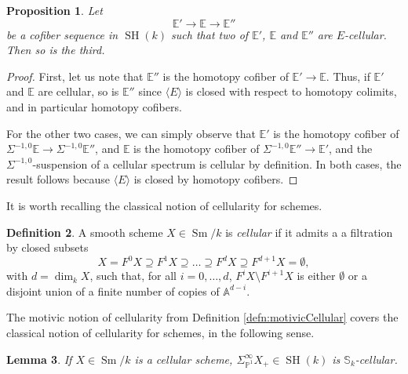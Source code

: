 \documentclass[10pt]{amsart}
\theoremstyle{definition}
\newtheorem{defn}{Definition}[section]
\theoremstyle{plain}
\newtheorem{prop}[defn]{Proposition}
\newtheorem{lemma}[defn]{Lemma}
\numberwithin{equation}{section}
\newcommand{\0}{\emptyset}
\newcommand{\A}{{\mathbb A}}
\newcommand{\E}{{\mathbb E}}
\renewcommand{\P}{{\mathbb P}}
\newcommand{\SH}{{\operatorname{SH}}}
\newcommand{\Sm}{{\operatorname{Sm}}}
\renewcommand{\dim}{{\operatorname{dim}}}
\begin{document}
\begin{prop}
\label{prop:s.e.s.-cellularity}
    Let 
    $$\E' \to \E \to \E''$$
    be a cofiber sequence in $\SH(k)$ such that two of $\E'$, $\E$ and $\E''$ are $E$-cellular. Then so is the third.
\end{prop}

\begin{proof}
    First, let us note that $\E''$ is the homotopy cofiber of $\E' \to \E$. Thus, if $\E'$ and $\E$ are cellular, so is $\E''$ since $\langle E \rangle$ is closed with respect to homotopy colimits, and in particular homotopy cofibers.

    For the other two cases, we can simply observe that $\E'$ is the homotopy cofiber of $\Sigma^{-1,0}\E \to \Sigma^{-1,0}\E''$, and $\E$ is the homotopy cofiber of $\Sigma^{-1,0}\E'' \to \E'$, and the $\Sigma^{-1,0}$-suspension of a cellular spectrum is cellular by definition. In both cases, the result follows because $\langle E \rangle$ is closed by homotopy cofibers.
\end{proof}

It is worth recalling the classical notion of cellularity for schemes.

\begin{defn}
\label{defn:CellularSchemes}
    A smooth scheme $X \in \Sm/k$ is \emph{cellular} if it admits a a filtration by closed subsets 
$$X =F^0X \supseteq F^1X \supseteq \ldots \supseteq F^dX \supseteq F^{d+1}X = \0,$$
with $d=\dim_kX$, such that, for all $i=0,\ldots, d$, $F^iX \setminus F^{i+1}X$ is either $\emptyset$ or a disjoint union of a finite number of copies of $\A^{d-i}$.
\end{defn}

The motivic notion of cellularity from Definition \ref{defn:motivicCellular} covers the classical notion of cellularity for schemes, in the following sense.

\begin{lemma}
\label{lemma:cellularSchemes}
    If $X \in \Sm/k$ is a cellular scheme, $\Sigma_{\P^1}^\infty X_+ \in \SH(k)$ is $\mathbb{S}_k$-cellular.
\end{lemma}
\end{document}
